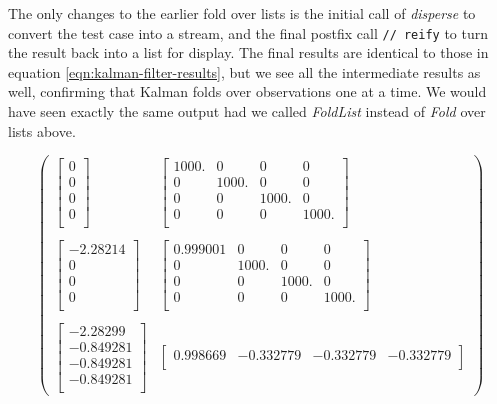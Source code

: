 \documentclass[10pt,oneside,x11names]{article}
\begin{document}
The only changes to the earlier fold over lists is the initial call of \emph{disperse} to
convert the test case into a stream, and the final postfix call \texttt{// reify}
to turn the result back into a list for display. The final results are identical
to those in equation \ref{eqn:kalman-filter-results}, but we see all the
intermediate results as well, confirming that Kalman folds over observations one
at a time. We would have seen exactly the same output had we called \emph{FoldList}
instead of \emph{Fold} over lists above.

\begin{equation}
\label{eql:full-big-results}
\begin{pmatrix}
\begin{bmatrix}
 0 \\
 0 \\
 0 \\
 0 \\
\end{bmatrix}
&
\begin{bmatrix}
 1000. & 0 & 0 & 0 \\
 0 & 1000. & 0 & 0 \\
 0 & 0 & 1000. & 0 \\
 0 & 0 & 0 & 1000. \\
\end{bmatrix}
\\ & \\
\begin{bmatrix}
 -2.28214 \\
 0 \\
 0 \\
 0 \\
\end{bmatrix}
&
\begin{bmatrix}
 0.999001 & 0 & 0 & 0 \\
 0 & 1000. & 0 & 0 \\
 0 & 0 & 1000. & 0 \\
 0 & 0 & 0 & 1000. \\
\end{bmatrix}
\\ \\
\begin{bmatrix}
 -2.28299 \\
 -0.849281 \\
 -0.849281 \\
 -0.849281 \\
\end{bmatrix}
&
\begin{bmatrix}
 0.998669 & -0.332779 & -0.332779 & -0.332779 \\

\end{bmatrix}
\end{pmatrix}
\end{equation}
\end{document}

